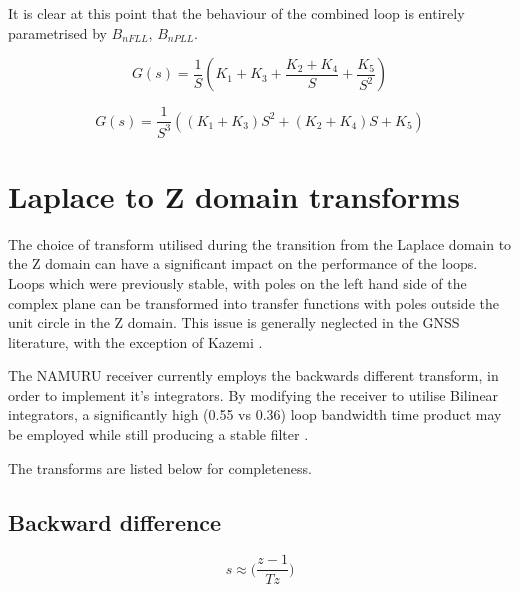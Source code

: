 It is clear at this point that the behaviour of the combined loop is entirely parametrised by $B_{nFLL}$,  $B_{nPLL}$.

\begin{equation}
G(s) = \frac{1}{S}(K_1 + K_3 + \frac{K_2 + K_4}{S} + \frac{K_5}{S^2})
\end{equation}

\begin{equation}
G(s) = \frac{1}{S^3}((K_1 + K_3)S^2 + (K_2 + K_4)S + K_5)
\end{equation}


\section{Laplace to Z domain transforms}
The choice of transform utilised during the transition from the Laplace domain to the Z domain can have a significant impact on the performance of the loops. Loops which were previously stable, with poles on the left hand side of the complex plane can be transformed into transfer functions with poles outside the unit circle in the Z domain. This issue is generally neglected in the GNSS literature, with the exception of Kazemi \cite{KazemiPHD}. 

The NAMURU receiver currently employs the backwards different transform, in order to implement it's integrators. By modifying the receiver to utilise Bilinear integrators, a significantly high (0.55 vs 0.36) loop bandwidth time product may be employed while still producing a stable filter \cite{Kaplan,Ward,KazemiPHD}.

The transforms are listed below for completeness. 

\subsection{Backward difference}

\begin{equation}
s \approx \Big(\frac{z-1}{Tz}\Big)
\end{equation}

\begin{comment}
\begin{equation}
 H(s) = \frac{s^2(K1) + s(K2) + K3}
 {s^3+ s^2(K1)+ s(K2) + K3}
\end{equation}

\begin{equation}
 H(s) = \frac{\Big(\frac{z-1}{Tz}\Big)^2(K1) + \Big(\frac{z-1}{Tz}\Big)(K2) + K3}{\Big(\frac{z-1}{Tz}\Big)^3+ \Big(\frac{z-1}{Tz}\Big)^2(K1)+ \Big(\frac{z-1}{Tz}\Big)(K2) + K3}
\end{equation}
\end{comment}

